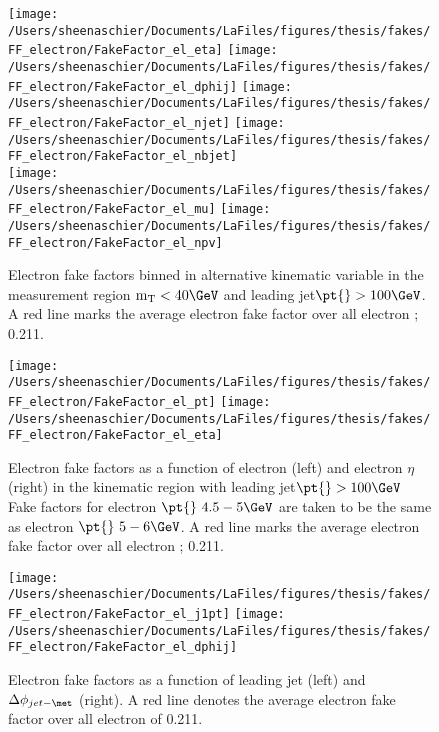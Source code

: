\begin{figure}[tbp]
  \centering
  \texttt{[image: /Users/sheenaschier/Documents/LaFiles/figures/thesis/fakes/FF\_electron/FakeFactor\_el\_eta]}
    \texttt{[image: /Users/sheenaschier/Documents/LaFiles/figures/thesis/fakes/FF\_electron/FakeFactor\_el\_dphij]}
      \texttt{[image: /Users/sheenaschier/Documents/LaFiles/figures/thesis/fakes/FF\_electron/FakeFactor\_el\_njet]}
  \texttt{[image: /Users/sheenaschier/Documents/LaFiles/figures/thesis/fakes/FF\_electron/FakeFactor\_el\_nbjet]}\\
    \texttt{[image: /Users/sheenaschier/Documents/LaFiles/figures/thesis/fakes/FF\_electron/FakeFactor\_el\_mu]}
  \texttt{[image: /Users/sheenaschier/Documents/LaFiles/figures/thesis/fakes/FF\_electron/FakeFactor\_el\_npv]}\\
  \caption{Electron fake factors binned in alternative kinematic variable in the measurement region $\mathrm{m_T} < 40\GeV$ and leading jet$ \pt{}>100\GeV$.  A red line marks the average electron fake factor over all electron \pt{}; 0.211. }
  \label{fig:elec_FF_all}
\end{figure}
\iffalse
\begin{figure}[tbp]
  \centering
  \texttt{[image: /Users/sheenaschier/Documents/LaFiles/figures/thesis/fakes/FF\_electron/FakeFactor\_el\_pt]}
  \texttt{[image: /Users/sheenaschier/Documents/LaFiles/figures/thesis/fakes/FF\_electron/FakeFactor\_el\_eta]}
  \caption{Electron fake factors as a function of electron \pt{} (left) and electron $\eta$ (right) in the kinematic region with leading jet$ \pt{}>100\GeV$  Fake factors for electron $\pt{}~ 4.5-5\GeV$ are taken to be the same as electron $\pt{}~5-6\GeV$.  A red line marks the average electron fake factor over all electron \pt{}; 0.211. }
  \label{fig:elec_FF_hist}
\end{figure}

\begin{figure}[tbp]
  \centering
  \texttt{[image: /Users/sheenaschier/Documents/LaFiles/figures/thesis/fakes/FF\_electron/FakeFactor\_el\_j1pt]}
  \texttt{[image: /Users/sheenaschier/Documents/LaFiles/figures/thesis/fakes/FF\_electron/FakeFactor\_el\_dphij]}\\
  \caption{Electron fake factors as a function of leading jet \pt{} (left) and $\Delta\phi_{jet-\met}$ (right). A red line denotes the average electron fake factor over all electron \pt{} of 0.211.}
  \label{fig:elec_FF_hadronic}
\end{figure}

